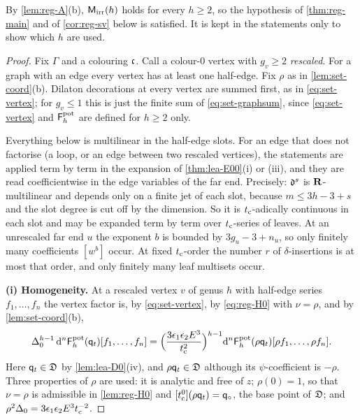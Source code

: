 By \cref{lem:reg-A}(b), $\mathsf{M}_{\mathrm{irr}}(h)$ holds for every $h\geq 2$, so the hypothesis of \cref{thm:reg-main} and of \cref{cor:reg-sv} below is satisfied. It is kept in the statements only to show which $h$ are used.

\begin{proof}
Fix $\Gamma$ and a colouring $\mathfrak{c}$. Call a colour-$0$ vertex with $g_{v}\geq 2$ \emph{rescaled}. For a graph with an edge every vertex has at least one half-edge. Fix $\rho$ as in \cref{lem:set-coord}(b). Dilaton decorations at every vertex are summed first, as in \cref{eq:set-vertex}; for $g_{v}\leq 1$ this is just the finite sum of \cref{eq:set-graphsum}, since \cref{eq:set-vertex} and $\mathsf{F}^{\mathrm{pot}}_h$ are defined for $h\geq 2$ only.

Everything below is multilinear in the half-edge slots. For an edge that does not factorise (a loop, or an edge between two rescaled vertices), the statements are applied term by term in the expansion of \cref{thm:lea-E00}(i) or (iii), and they are read coefficientwise in the edge variables of the far end. Precisely: $\mathfrak{d}^s$ is $\mathbf{R}$-multilinear and depends only on a finite jet of each slot, because $m\leq 3h-3+s$ and the slot degree is cut off by the dimension. So it is $t_{\mathrm{c}}$-adically continuous in each slot and may be expanded term by term over $t_{\mathrm{c}}$-series of leaves. At an unrescaled far end $u$ the exponent $b$ is bounded by $3g_u-3+n_u$, so only finitely many coefficients $[w^b]$ occur. At fixed $t_{\mathrm{c}}$-order the number $r$ of $\delta$-insertions is at most that order, and only finitely many leaf multisets occur.

\medskip\noindent\textbf{(i) Homogeneity.} At a rescaled vertex $v$ of genus $h$ with half-edge series $f_1,\dots,f_n$ the vertex factor is, by \cref{eq:set-vertex}, by \cref{eq:reg-H0} with $\nu=\rho$, and by \cref{lem:set-coord}(b),
\[
\Delta_0^{h-1}\,\mathrm{d}^n\mathsf{F}^{\mathrm{pot}}_h(\mathsf{q}_{t})[f_1,\dots,f_n]=\Big(\frac{3\epsilon_1\epsilon_2E^3}{t_{\mathrm{c}}^2}\Big)^{h-1}\mathrm{d}^n\mathsf{F}^{\mathrm{pot}}_h(\rho\mathsf{q}_{t})[\rho f_1,\dots,\rho f_n].
\]
Here $\mathsf{q}_{t}\in\mathfrak{D}$ by \cref{lem:lea-D0}(iv), and $\rho\mathsf{q}_{t}\in\mathfrak{D}$ although its $\psi$-coefficient is $-\rho$. Three properties of $\rho$ are used: it is analytic and free of $z$; $\rho(0)=1$, so that $\nu=\rho$ is admissible in \cref{lem:reg-H0} and $[t_{\mathrm{c}}^0](\rho\mathsf{q}_{t})=\mathsf{q}_{\circ}$, the base point of $\mathfrak{D}$; and $\rho^2\Delta_0=3\epsilon_1\epsilon_2E^3t_{\mathrm{c}}^{-2}$.


\end{proof}
